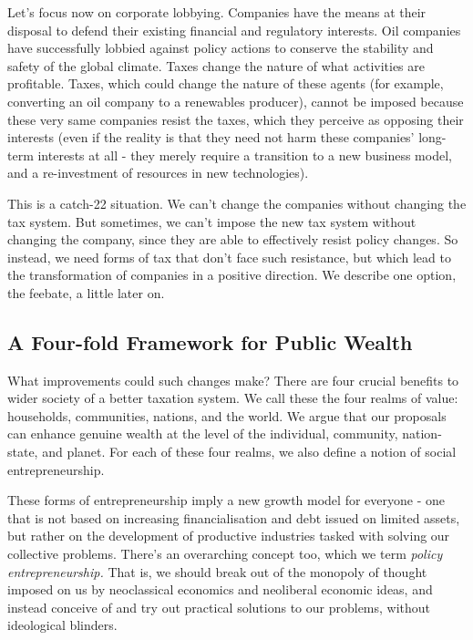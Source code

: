 \documentclass[]{tufte-handout}
\begin{document}
Let's focus now on corporate lobbying. Companies have the means at their
disposal to defend their existing financial and regulatory interests.
Oil companies have successfully lobbied against policy actions to
conserve the stability and safety of the global climate. Taxes change
the nature of what activities are profitable. Taxes, which could change
the nature of these agents (for example, converting an oil company to a
renewables producer), cannot be imposed because these very same
companies resist the taxes, which they perceive as opposing their
interests (even if the reality is that they need not harm these
companies' long-term interests at all - they merely require a transition
to a new business model, and a re-investment of resources in new
technologies).

This is a catch-22 situation. We can't change the companies without
changing the tax system. But sometimes, we can't impose the new tax
system without changing the company, since they are able to effectively
resist policy changes. So instead, we need forms of tax that don't face
such resistance, but which lead to the transformation of companies in a
positive direction. We describe one option, the feebate, a little later
on.

\hypertarget{a-four-fold-framework-for-public-wealth}{%
\subsection{A Four-fold Framework for Public
Wealth}\label{a-four-fold-framework-for-public-wealth}}

What improvements could such changes make? There are four crucial
benefits to wider society of a better taxation system. We call these the
four realms of value: households, communities, nations, and the world.
We argue that our proposals can enhance genuine wealth at the level of
the individual, community, nation-state, and planet. For each of these
four realms, we also define a notion of social entrepreneurship.

These forms of entrepreneurship imply a new growth model for everyone -
one that is not based on increasing financialisation and debt issued on
limited assets, but rather on the development of productive industries
tasked with solving our collective problems. There's an overarching
concept too, which we term \emph{policy entrepreneurship.} That is, we
should break out of the monopoly of thought imposed on us by
neoclassical economics and neoliberal economic ideas, and instead
conceive of and try out practical solutions to our problems, without
ideological blinders.
\end{document}

